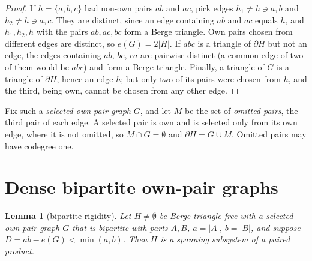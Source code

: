 \documentclass[11pt]{article}
\newtheorem{lemma}[theorem]{Lemma}
\theoremstyle{remark}
\newcommand{\sh}{\partial}
\begin{document}
\begin{proof}
If $h=\{a,b,c\}$ had non-own pairs $ab$ and $ac$, pick edges
$h_1\ne h\ni a,b$ and $h_2\ne h\ni a,c$. They are distinct, since an edge
containing $ab$ and $ac$ equals $h$, and $h_1,h_2,h$ with the pairs
$ab,ac,bc$ form a Berge triangle. Own pairs chosen from different edges are
distinct, so $e(G)=2|H|$. If $abc$ is a triangle of $\sh H$ but not an edge,
the edges containing $ab$, $bc$, $ca$ are pairwise distinct (a common edge
of two of them would be $abc$) and form a Berge triangle. Finally, a
triangle of $G$ is a triangle of $\sh H$, hence an edge $h$; but only two of
its pairs were chosen from $h$, and the third, being own, cannot be chosen
from any other edge.
\end{proof}

Fix such a \emph{selected own-pair graph} $G$, and let $M$ be the set of
\emph{omitted pairs}, the third pair of each edge. A selected pair is own
and is selected only from its own edge, where it is not omitted, so
$M\cap G=\emptyset$ and $\sh H=G\cup M$. Omitted pairs may have codegree one.

\section{Dense bipartite own-pair graphs}

\begin{lemma}[bipartite rigidity]\label{lem:rigid}
Let $H\neq\emptyset$ be Berge-triangle-free with a selected own-pair graph
$G$ that is bipartite with parts $A,B$, $a=|A|$, $b=|B|$, and suppose
$D=ab-e(G)<\min(a,b)$. Then $H$ is a spanning subsystem of a paired product.
\end{lemma}
\end{document}
